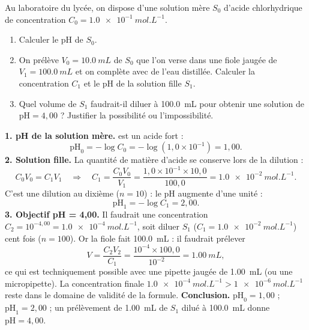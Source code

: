\documentclass[11pt]{article}
\begin{document}
\begin{exoresolu}
Au laboratoire du lycée, on dispose d'une solution mère $S_0$ d'acide chlorhydrique de concentration $C_0 = \SI{1,0e-1}{mol.L^{-1}}$.
\begin{enumerate}
\item Calculer le pH de $S_0$.
\item On prélève $V_0 = \SI{10,0}{mL}$ de $S_0$ que l'on verse dans une fiole jaugée de $V_1 = \SI{100,0}{mL}$ et on complète avec de l'eau distillée. Calculer la concentration $C_1$ et le pH de la solution fille $S_1$.
\item Quel volume de $S_1$ faudrait-il diluer à \SI{100,0}{mL} pour obtenir une solution de $\text{pH} = 4,00$ ? Justifier la possibilité ou l'impossibilité.
\end{enumerate}
\tcblower
\textbf{1. pH de la solution mère.}  est un acide fort :
\[ \text{pH}_0 = -\log C_0 = -\log(1,0\times10^{-1}) = 1,00. \]
\textbf{2. Solution fille.} La quantité de matière d'acide se conserve lors de la dilution :
\[ C_0 V_0 = C_1 V_1 \quad\Longrightarrow\quad C_1 = \frac{C_0 V_0}{V_1} = \frac{1,0\times10^{-1}\times 10,0}{100,0} = \SI{1,0e-2}{mol.L^{-1}}. \]
C'est une dilution au dixième ($n=10$) : le pH augmente d'une unité :
\[ \text{pH}_1 = -\log C_1 = 2,00. \]
\textbf{3. Objectif pH = 4,00.} Il faudrait une concentration $C_2 = 10^{-4,00} = \SI{1,0e-4}{mol.L^{-1}}$, soit diluer $S_1$ ($C_1 = \SI{1,0e-2}{mol.L^{-1}}$) cent fois ($n=100$). Or la fiole fait \SI{100,0}{mL} : il faudrait prélever
\[ V = \frac{C_2 V_2}{C_1} = \frac{10^{-4}\times 100,0}{10^{-2}} = \SI{1,00}{mL}, \]
ce qui est techniquement possible avec une pipette jaugée de \SI{1,00}{mL} (ou une micropipette). La concentration finale $\SI{1,0e-4}{mol.L^{-1}} > \SI{1e-6}{mol.L^{-1}}$ reste dans le domaine de validité de la formule.
\textbf{Conclusion.} $\text{pH}_0 = 1,00$ ; $\text{pH}_1 = 2,00$ ; un prélèvement de \SI{1,00}{mL} de $S_1$ dilué à \SI{100,0}{mL} donne $\text{pH} = 4,00$.
\end{exoresolu}
\end{document}

